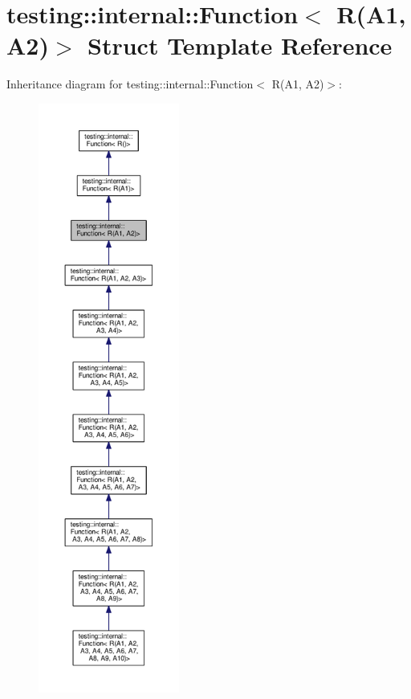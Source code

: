\hypertarget{structtesting_1_1internal_1_1Function_3_01R_07A1_00_01A2_08_4}{}\section{testing\+:\+:internal\+:\+:Function$<$ R(A1, A2)$>$ Struct Template Reference}
\label{structtesting_1_1internal_1_1Function_3_01R_07A1_00_01A2_08_4}


Inheritance diagram for testing\+:\+:internal\+:\+:Function$<$ R(A1, A2)$>$\+:\nopagebreak
\begin{figure}[H]
\begin{center}
\leavevmode
\includegraphics[height=550pt]{structtesting_1_1internal_1_1Function_3_01R_07A1_00_01A2_08_4__inherit__graph}
\end{center}
\end{figure}


